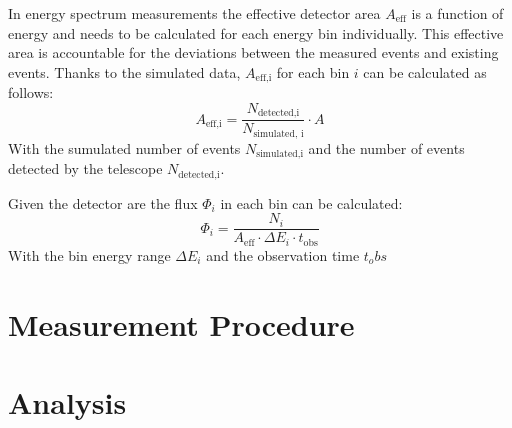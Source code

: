     In energy spectrum measurements the effective detector area $A_\text{eff}$ is a function of energy and needs to be calculated for each energy bin individually.
    This effective area is accountable for the deviations between the measured events and existing events.
    Thanks to the simulated data, $A_\text{eff,i}$ for each bin $i$ can be calculated as follows:
    \begin{equation}
        A_\text{eff,i}=\frac{N_\text{detected,i}}{N_\text{simulated, i}}\cdot A
    \end{equation}
    With the sumulated number of events $N_\text{simulated,i}$ and the number of events detected by the telescope $N_\text{detected,i}$.

    Given the detector are the flux $\Phi_i$ in each bin can be calculated:
    \begin{equation}
        \Phi_i=\frac{N_i}{A_\text{eff} \cdot \Delta E_i \cdot t_\text{obs}}
    \end{equation}
    With the bin energy range $\Delta E_i$ and the observation time $t_obs$
    \section{Measurement Procedure}
    

%
%
    \section{Analysis}
        
